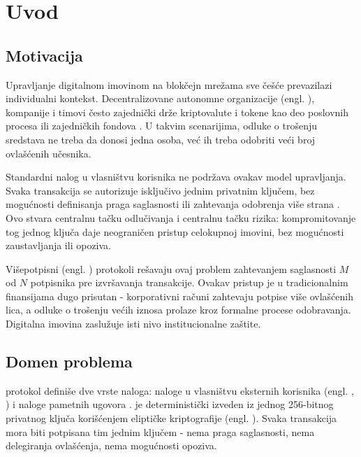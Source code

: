 \chapter{Uvod}

\section{Motivacija}

Upravljanje digitalnom imovinom na blok\v cejn mre\v zama sve \v ce\v s\' ce prevazilazi individualni kontekst. Decentralizovane autonomne organizacije (engl. ), kompanije i timovi \v cesto zajedni\v cki dr\v ze kriptovalute i tokene kao deo poslovnih procesa ili zajedni\v ckih fondova \cite{buterin2014}. U takvim scenarijima, odluke o tro\v senju sredstava ne treba da donosi jedna osoba, ve\' c ih treba odobriti ve\' ci broj ovla\v s\' cenih u\v cesnika.

Standardni  nalog u vlasni\v stvu korisnika ne podr\v zava ovakav model upravljanja. Svaka transakcija se autorizuje isklju\v civo jednim privatnim klju\v cem, bez mogu\' cnosti definisanja praga saglasnosti ili zahtevanja odobrenja vi\v se strana \cite{antonopoulos2018}. Ovo stvara centralnu ta\v cku odlu\v civanja i centralnu ta\v cku rizika: kompromitovanje tog jednog klju\v ca daje neograni\v cen pristup celokupnoj imovini, bez mogu\' cnosti zaustavljanja ili opoziva.

Vi\v sepotpisni (engl. ) protokoli re\v savaju ovaj problem zahtevanjem saglasnosti $M$ od $N$ potpisnika pre izvr\v savanja transakcije. Ovakav pristup je u tradicionalnim finansijama dugo prisutan - korporativni ra\v cuni zahtevaju potpise vi\v se ovla\v s\' cenih lica, a odluke o tro\v senju ve\' cih iznosa prolaze kroz formalne procese odobravanja. Digitalna imovina zaslu\v zuje isti nivo institucionalne za\v stite.

\section{Domen problema}

 protokol defini\v se dve vrste naloga: naloge u vlasni\v stvu eksternih korisnika (engl. , ) i naloge pametnih ugovora \cite{wood2024}.  je deterministi\v cki izveden iz jednog 256-bitnog privatnog klju\v ca kori\v s\' cenjem elipti\v cke kriptografije (engl. ). Svaka transakcija mora biti potpisana tim jednim klju\v cem - nema praga saglasnosti, nema delegiranja ovla\v s\' cenja, nema mogu\' cnosti opoziva.

